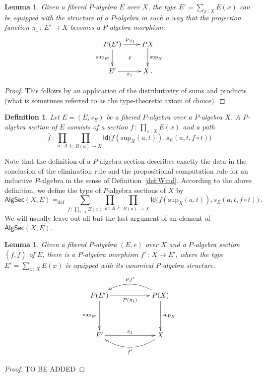 \documentclass[10pt,a4paper,oneside,reqno]{amsart}
\theoremstyle{mythm}
\newtheorem{lemma}[theorem]{Lemma}
\theoremstyle{mydef}
\newtheorem{definition}[theorem]{Definition}
\theoremstyle{myrmk}
\newcommand{\ie}{\text{i.e.\ }}
\newcommand{\defeq}{=_{\mathrm{def}}}
\newcommand{\co}{\,{:}\,}
\newcommand{\Id}{\mathsf{Id}}
\renewcommand{\sup}{\mathrm{sup}}
\newcommand{\PalgSec}{\mathsf{AlgSec}}
\begin{document}
\begin{lemma}\label{lem:fibalg}
Given a fibered $P$-algebra $E$ over $X$, the type $E' =  \sum_{x \co  X} E(x)$ can be equipped with the structure of a $P$-algebra in such a way that  the projection function $\pi_1 \co E'\to X$ becomes a $P$-algebra morphism:
\[
\xymatrix{
P(E') \ar[r]^{P\pi_1} \ar[d]_-{\sup_{E'}} \ar@{}[rd]|{p} & PX \ar[d]^{\sup_X} \\ 
E'  \ar[r]_-{\pi_1} & X \, .}
 \]
\end{lemma}

\begin{proof} This follows by an application of the distributivity of sums and products (\ie what is sometimes
referred to as the type-theoretic axiom of choice). 
\end{proof}

\begin{definition} \label{def:fibalgsection} Let $E = (E, s_E)$ be a fibered $P$-algebra over a $P$-algebra $X$.  
A \emph{$P$-algebra section} of $E$ consists of a section $f \co \prod_{x \co X} E(x)$ and a path
\[ 
\bar{f} \co \prod_{a \co A} \prod_{t \co B(a) \to X} \Id \big( f(\sup_X(a,t)), s_E(a, t, f \circ t) \big)
\]
\end{definition} 

Note that the definition of a $P$-algebra section describes exactly the data in the conclusion of the elimination rule and the propositional computation rule for an inductive $P$-algebra in the sense of Definition~\ref{def:Wind}. According to the above definition, we define the type of $P$-algebra sections of $X$ by
\[ 
\PalgSec(X,E)  \defeq \sum_{f  \co \prod_{x \co X} E(x)}\prod_{a \co A} \prod_{t \co B(a) \to X} 
\Id\big(   f(\sup_X(a,t)) ,  s_E(a,t,f  \circ t) \big) \, .
\]
We will usually leave out all but the last argument of an element of $\PalgSec(X,E)$. 



\begin{lemma}
Given a fibered $P$-algebra $(E, e)$ over $X$ and a $P$-algebra section $(f, \bar{f})$ of $E$, there is a $P$-algebra 
morphism $f' \co X \to E'$, where the type $E' = \sum_{x \co X} E(x)$ is equipped with its canonical 
$P$-algebra structure. 
\[
\xymatrix@C=2cm@R=1.5cm{
P(E')  \ar[d]_-{\sup_{E'}}   \ar[r]_{P(\pi_1)}   & P(X)  \ar[d]^-{\sup_X}   \ar@/_1.4pc/[l]_{Pf'}  \\ 
E'  \ar[r]^{\pi_1}    & X \ar@/^1.4pc/[l]^{f'} }
 \]
\end{lemma}

\begin{proof} TO BE ADDED 
\end{proof}
\end{document}
